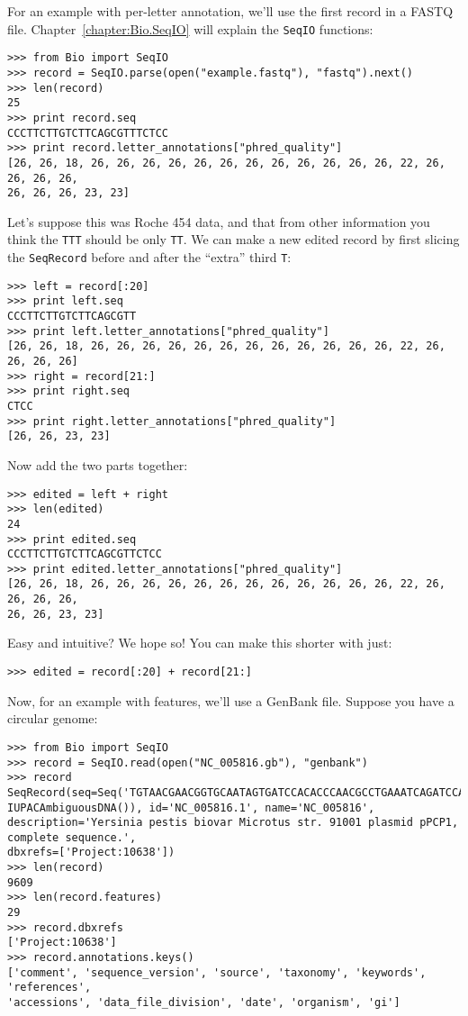 \documentclass{report}
\begin{document}
For an example with per-letter annotation, we'll use the first record in a
FASTQ file. Chapter~\ref{chapter:Bio.SeqIO} will explain the \verb|SeqIO| functions:

\begin{verbatim}
>>> from Bio import SeqIO
>>> record = SeqIO.parse(open("example.fastq"), "fastq").next()
>>> len(record)
25
>>> print record.seq
CCCTTCTTGTCTTCAGCGTTTCTCC
>>> print record.letter_annotations["phred_quality"]
[26, 26, 18, 26, 26, 26, 26, 26, 26, 26, 26, 26, 26, 26, 26, 22, 26, 26, 26, 26,
26, 26, 26, 23, 23]
\end{verbatim}

\noindent Let's suppose this was Roche 454 data, and that from other information
you think the \texttt{TTT} should be only \texttt{TT}. We can make a new edited
record by first slicing the \verb|SeqRecord| before and after the ``extra''
third \texttt{T}:

\begin{verbatim}
>>> left = record[:20]
>>> print left.seq
CCCTTCTTGTCTTCAGCGTT
>>> print left.letter_annotations["phred_quality"]
[26, 26, 18, 26, 26, 26, 26, 26, 26, 26, 26, 26, 26, 26, 26, 22, 26, 26, 26, 26]
>>> right = record[21:]
>>> print right.seq
CTCC
>>> print right.letter_annotations["phred_quality"]
[26, 26, 23, 23]
\end{verbatim}

\noindent Now add the two parts together:

\begin{verbatim}
>>> edited = left + right
>>> len(edited)
24
>>> print edited.seq
CCCTTCTTGTCTTCAGCGTTCTCC
>>> print edited.letter_annotations["phred_quality"]
[26, 26, 18, 26, 26, 26, 26, 26, 26, 26, 26, 26, 26, 26, 26, 22, 26, 26, 26, 26,
26, 26, 23, 23]
\end{verbatim}

\noindent Easy and intuitive? We hope so! You can make this shorter with just:

\begin{verbatim}
>>> edited = record[:20] + record[21:]
\end{verbatim}

Now, for an example with features, we'll use a GenBank file.
Suppose you have a circular genome:

\begin{verbatim}
>>> from Bio import SeqIO
>>> record = SeqIO.read(open("NC_005816.gb"), "genbank")
>>> record
SeqRecord(seq=Seq('TGTAACGAACGGTGCAATAGTGATCCACACCCAACGCCTGAAATCAGATCCAGG...CTG',
IUPACAmbiguousDNA()), id='NC_005816.1', name='NC_005816',
description='Yersinia pestis biovar Microtus str. 91001 plasmid pPCP1, complete sequence.',
dbxrefs=['Project:10638'])
>>> len(record)
9609
>>> len(record.features)
29
>>> record.dbxrefs
['Project:10638']
>>> record.annotations.keys()
['comment', 'sequence_version', 'source', 'taxonomy', 'keywords', 'references',
'accessions', 'data_file_division', 'date', 'organism', 'gi']
\end{verbatim}
\end{document}
